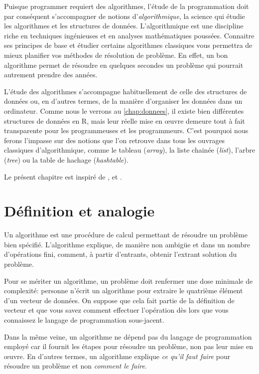 Puisque programmer requiert des algorithmes, l'étude de la
programmation doit par conséquent s'accompagner de notions
d'\emph{algorithmique}, la science qui étudie les
algorithmes et les structures de données. L'algorithmique est une
discipline riche en techniques ingénieuses et en analyses
mathématiques poussées. Connaitre ses principes de base et étudier
certains algorithmes classiques vous permettra de mieux planifier vos
méthodes de résolution de problème. En effet, un bon algorithme permet
de résoudre en quelques secondes un problème qui pourrait autrement
prendre des années.

L'étude des algorithmes s'accompagne habituellement de celle des
structures de données ou, en d'autres termes, de la manière
d'organiser les données dans un ordinateur. Comme nous le verrons au
\autoref{chap:donnees}, il existe bien différentes structures de
données en R, mais leur réelle mise en œuvre demeure tout à fait
transparente pour les programmeuses et les programmeurs. C'est
pourquoi nous ferons l'impasse sur des notions que l'on retrouve dans
tous les ouvrages classiques d'algorithmique, comme le tableau
(\emph{array}), la liste chainée (\emph{list}), l'arbre (\emph{tree})
ou la table de hachage (\emph{hashtable}).

Le présent chapitre est inspiré de \citet{Sussman:scheme:1996},
\citet{Knuth:ACP:vol1:1997} et \citet{Stephens:algorithms:2013}.


\section{Définition et analogie}
\label{sec:algorithmes:definition}

Un algorithme est une procédure de calcul
permettant de résoudre un problème bien spécifié. L'algorithme
explique, de manière non ambigüe et dans un nombre d'opérations fini,
comment, à partir d'entrants, obtenir l'extrant solution du problème.

Pour se mériter un algorithme, un problème doit renfermer une dose
minimale de complexité: personne n'écrit un algorithme pour extraire
le quatrième élément d'un vecteur de données. On suppose que cela fait
partie de la définition de vecteur et que vous savez comment effectuer
l'opération dès lors que vous connaissez le langage de programmation
sous-jacent.

Dans la même veine, un algorithme ne dépend pas du langage de
programmation employé car il fournit les étapes pour résoudre un
problème, non pas leur mise en œuvre. En d'autres termes, un
algorithme explique \emph{ce qu'il faut faire} pour résoudre un
problème et non \emph{comment le faire}.

